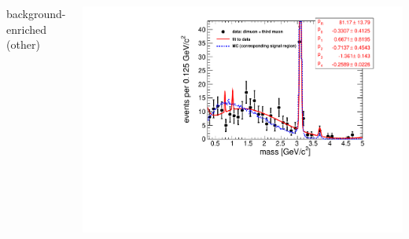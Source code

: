 \documentclass[compress]{beamer}
\begin{document}
\begin{frame}
\begin{columns}
\centering background-enriched (other)

\includegraphics[width=\linewidth]{fullscale-backgroundEnriched_massF.pdf}
\end{columns}
\end{frame}
\end{document}
